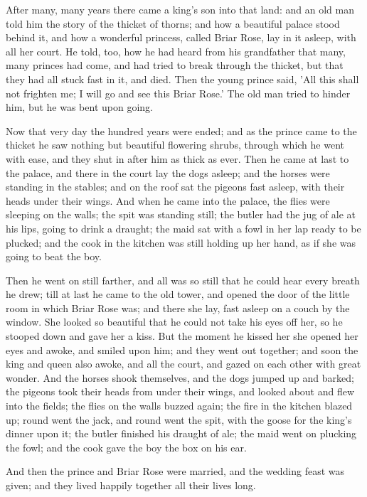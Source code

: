 \documentclass[12pt]{book}
\begin{document}
After many, many years there came a king's son into that land: and an
old man told him the story of the thicket of thorns; and how a
beautiful palace stood behind it, and how a wonderful princess, called
Briar Rose, lay in it asleep, with all her court. He told, too, how he
had heard from his grandfather that many, many princes had come, and
had tried to break through the thicket, but that they had all stuck
fast in it, and died. Then the young prince said, 'All this shall not
frighten me; I will go and see this Briar Rose.' The old man tried to
hinder him, but he was bent upon going.

Now that very day the hundred years were ended; and as the prince came
to the thicket he saw nothing but beautiful flowering shrubs, through
which he went with ease, and they shut in after him as thick as ever.
Then he came at last to the palace, and there in the court lay the
dogs asleep; and the horses were standing in the stables; and on the
roof sat the pigeons fast asleep, with their heads under their wings.
And when he came into the palace, the flies were sleeping on the
walls; the spit was standing still; the butler had the jug of ale at
his lips, going to drink a draught; the maid sat with a fowl in her
lap ready to be plucked; and the cook in the kitchen was still holding
up her hand, as if she was going to beat the boy.

Then he went on still farther, and all was so still that he could hear
every breath he drew; till at last he came to the old tower, and
opened the door of the little room in which Briar Rose was; and there
she lay, fast asleep on a couch by the window. She looked so beautiful
that he could not take his eyes off her, so he stooped down and gave
her a kiss. But the moment he kissed her she opened her eyes and
awoke, and smiled upon him; and they went out together; and soon the
king and queen also awoke, and all the court, and gazed on each other
with great wonder. And the horses shook themselves, and the dogs
jumped up and barked; the pigeons took their heads from under their
wings, and looked about and flew into the fields; the flies on the
walls buzzed again; the fire in the kitchen blazed up; round went the
jack, and round went the spit, with the goose for the king's dinner
upon it; the butler finished his draught of ale; the maid went on
plucking the fowl; and the cook gave the boy the box on his ear.

And then the prince and Briar Rose were married, and the wedding feast
was given; and they lived happily together all their lives long.
\end{document}
